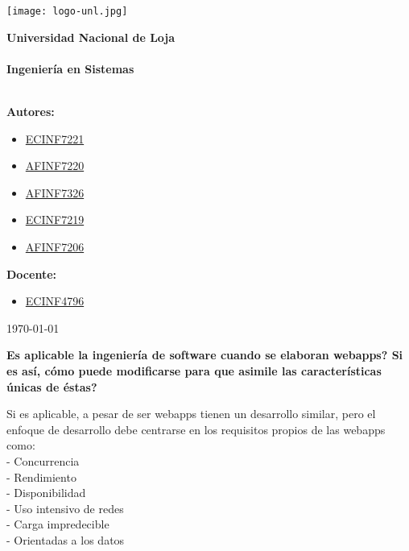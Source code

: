 \documentclass[6pt]{report}
\begin{document}
\centering
\newcommand{\titulo}{ Universidad Nacional de Loja \\ \ \\ Ingeniería en Sistemas \\ \ \\}
\newcommand{\fecha}{\today}




\pagestyle{empty}


\begin{center}\texttt{[image: logo-unl.jpg]}\end{center}


\Huge\bf\titulo
\raggedright\textbf{Autores:}
\begin{itemize}
\item \href{http://www.iralis.org/?q=node%2F10&paso=10&letra=&id=7221}{ECINF7221}
\item \href{http://www.iralis.org/?q=node%2F10&paso=10&letra=&id=7220}{AFINF7220}
\item \href{http://www.iralis.org/?q=node%2F10&paso=10&letra=B&id=7326}{AFINF7326}
\item \href{http://www.iralis.org/?q=node%2F10&paso=10&letra=E&id=7219}{ECINF7219}
\item \href{http://www.iralis.org/?q=node%2F10&paso=10&letra=G&id=7206}{AFINF7206}
\end{itemize}
\raggedright\textbf{Docente:\\}
\begin{itemize}
\item \href{http://www.iralis.org/?q=node%2F10&paso=10&letra=O&id=4796}{ECINF4796}
\end{itemize} 

\flushleft
\Large\rm\fecha

\newpage



\textbf{Es aplicable la ingeniería de software cuando se elaboran webapps? Si es así, cómo puede modificarse para que asimile las características únicas de éstas?}

Si es aplicable, a pesar de ser webapps tienen un desarrollo similar, pero el enfoque de desarrollo debe centrarse en los requisitos propios de las webapps como:\\
- Concurrencia \\ 
- Rendimiento \\
- Disponibilidad \\
- Uso intensivo de redes \\
- Carga impredecible \\
- Orientadas a los datos \\
\end{document}
